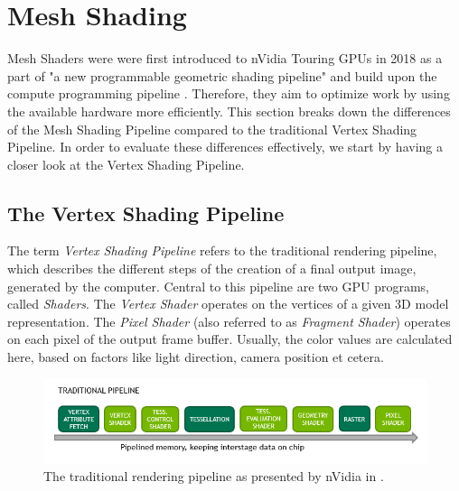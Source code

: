 \chapter{Mesh Shading} \label{cpt-mesh-shading}


Mesh Shaders were were first introduced to nVidia Touring \ac{GPU}s in 2018 as a part of
"a new programmable geometric shading pipeline" and build upon the compute programming 
pipeline \cite[Christoph Kubisch]{Kubisch2018}. Therefore, they aim to optimize work by 
using the available hardware more efficiently. This section breaks down the differences 
of the Mesh Shading Pipeline compared to the traditional Vertex Shading Pipeline. In order 
to evaluate these differences effectively, we start by having a closer look at the 
Vertex Shading Pipeline.

\section{The Vertex Shading Pipeline} \label{sec-vertex-shading-pipeline}

The term \emph{Vertex Shading Pipeline} refers to the traditional rendering pipeline, which 
describes the different steps of the creation of a final output image, generated by the 
computer. Central to this pipeline are two \ac{GPU} programs, called \emph{Shaders}. The 
\emph{Vertex Shader} operates on the vertices of a given 3D model representation. 
The \emph{Pixel Shader} (also referred to as \emph{Fragment Shader}) operates on each pixel 
of the output frame buffer. Usually, the color values are calculated here, based on factors 
like light direction, camera position et cetera. \\

\begin{figure}[h]
    \centering
    \includegraphics[width=\linewidth]{images/graphics/traditional-rendering-pipeline.png}
    \caption{The traditional rendering pipeline as presented by nVidia in \cite[Christoph Kubisch]{Kubisch2018}.}
    \label{fig:traditional-rendering-pipeline}
\end{figure}

